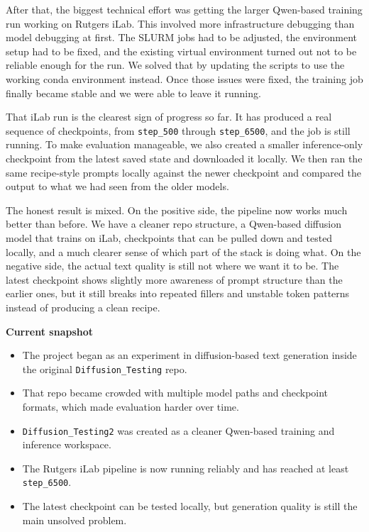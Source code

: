 \documentclass[10pt]{article}
\begin{document}
After that, the biggest technical effort was getting the larger Qwen-based training run working on Rutgers iLab. This involved more infrastructure debugging than model debugging at first. The SLURM jobs had to be adjusted, the environment setup had to be fixed, and the existing virtual environment turned out not to be reliable enough for the run. We solved that by updating the scripts to use the working conda environment instead. Once those issues were fixed, the training job finally became stable and we were able to leave it running.

That iLab run is the clearest sign of progress so far. It has produced a real sequence of checkpoints, from \texttt{step\_500} through \texttt{step\_6500}, and the job is still running. To make evaluation manageable, we also created a smaller inference-only checkpoint from the latest saved state and downloaded it locally. We then ran the same recipe-style prompts locally against the newer checkpoint and compared the output to what we had seen from the older models.

The honest result is mixed. On the positive side, the pipeline now works much better than before. We have a cleaner repo structure, a Qwen-based diffusion model that trains on iLab, checkpoints that can be pulled down and tested locally, and a much clearer sense of which part of the stack is doing what. On the negative side, the actual text quality is still not where we want it to be. The latest checkpoint shows slightly more awareness of prompt structure than the earlier ones, but it still breaks into repeated fillers and unstable token patterns instead of producing a clean recipe.

\vspace{0.5em}
\textbf{Current snapshot}
\begin{itemize}
  \item The project began as an experiment in diffusion-based text generation inside the original \texttt{Diffusion\_Testing} repo.
  \item That repo became crowded with multiple model paths and checkpoint formats, which made evaluation harder over time.
  \item \texttt{Diffusion\_Testing2} was created as a cleaner Qwen-based training and inference workspace.
  \item The Rutgers iLab pipeline is now running reliably and has reached at least \texttt{step\_6500}.
  \item The latest checkpoint can be tested locally, but generation quality is still the main unsolved problem.
\end{itemize}
\end{document}
